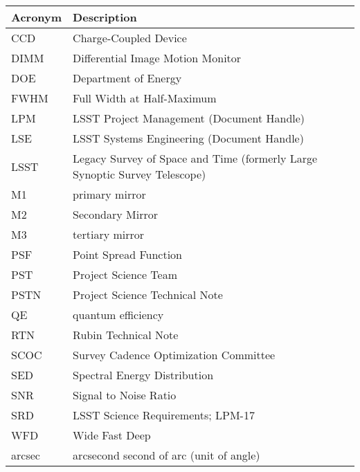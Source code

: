 \addtocounter{table}{-1}
\begin{longtable}{p{}p{}}\hline
\textbf{Acronym} & \textbf{Description}  \\\hline

CCD & Charge-Coupled Device \\\hline
DIMM & Differential Image Motion Monitor \\\hline
DOE & Department of Energy \\\hline
FWHM & Full Width at Half-Maximum \\\hline
LPM & LSST Project Management (Document Handle) \\\hline
LSE & LSST Systems Engineering (Document Handle) \\\hline
LSST & Legacy Survey of Space and Time (formerly Large Synoptic Survey Telescope) \\\hline
M1 & primary mirror \\\hline
M2 & Secondary Mirror \\\hline
M3 & tertiary mirror \\\hline
PSF & Point Spread Function \\\hline
PST & Project Science Team \\\hline
PSTN & Project Science Technical Note \\\hline
QE & quantum efficiency \\\hline
RTN & Rubin Technical Note \\\hline
SCOC & Survey Cadence Optimization Committee \\\hline
SED & Spectral Energy Distribution \\\hline
SNR & Signal to Noise Ratio \\\hline
SRD & LSST Science Requirements; LPM-17 \\\hline
WFD & Wide Fast Deep \\\hline
arcsec & arcsecond second of arc (unit of angle) \\\hline
\end{longtable}
